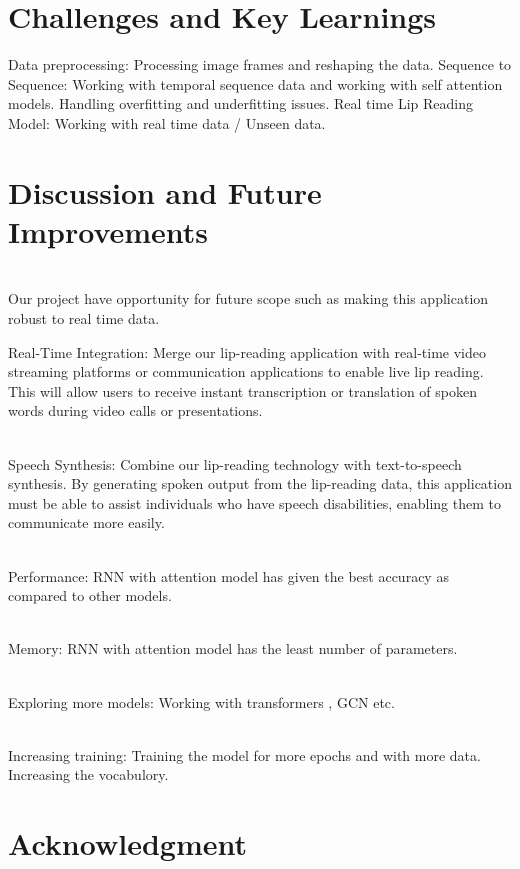 \documentclass[conference]{IEEEtran}
\begin{document}

\section{Challenges and Key Learnings}
 Data preprocessing: Processing image frames and reshaping the data.
 Sequence to Sequence: Working with temporal sequence data and working with self attention models.
 Handling overfitting and underfitting issues.
 Real time Lip Reading Model: Working with real time data / Unseen data.
\section{Discussion and Future Improvements}

\\ Our project have opportunity for future scope such as making this application robust to real time data.

Real-Time Integration: Merge our lip-reading application with real-time video streaming platforms or communication applications to enable live lip reading. This will allow users to receive instant transcription or translation of spoken words during video calls or presentations.

\\ Speech Synthesis: Combine our lip-reading technology with text-to-speech synthesis. By generating spoken output from the lip-reading data, this application must be able to assist individuals who have speech disabilities, enabling them to communicate more easily.

\\ Performance: RNN with attention model has given the best accuracy as compared to other models. 

\\ Memory: RNN with attention model has the least number of parameters.

\\ Exploring more models: Working with transformers , GCN etc.

\\ Increasing training: Training the model for more epochs and with more data. Increasing the vocabulory.
\section*{Acknowledgment}
\end{document}
